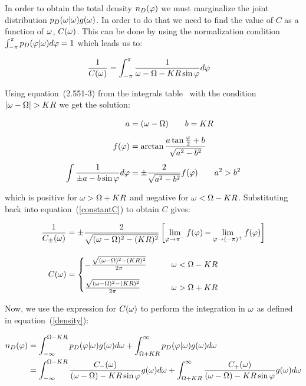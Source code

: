 In order to obtain the total density $n_D(\varphi)$ we must marginalize the joint distribution $p_D(\omega | \omega)g(\omega)$. In
order to do that we need to find the value of $C$ as a function of $\omega$, $C(\omega)$. This can be done by using the normalization
condition $\int_{-\pi}^{\pi}p_D(\varphi | \omega)d\varphi=1$ which leads us to:

\begin{align}
    \frac{1}{C(\omega)} &= \int_{-\pi}^{\pi}\frac{1}{\omega - \Omega - K R \sin \varphi}d\varphi
    \label{constantC}
\end{align}

\noindent Using equation~(2.551-3) from the integrals table~\cite{jeffrey2007table} with the condition $|\omega-\Omega| > K R$ we get
the solution:

\begin{align}
    a&=(\omega-\Omega) \qquad b=K R \notag\\[5pt]
    f(\varphi) &= \arctan\frac{a\tan \frac{\varphi}{2}+b}{\sqrt{a^2-b^2}} \notag\\[5pt]
    \int\frac{1}{\pm a-b\sin \varphi}d\varphi &= \pm\frac{2}{\sqrt{a^2-b^2}}f(\varphi) \qquad a^2 > b^2 \notag
\end{align}

\noindent which is positive for $\omega > \Omega + K R$ and negative for $\omega < \Omega - K R$. Substituting back into
equation~(\ref{constantC}) to obtain $C$ gives:

\begin{align}
    \frac{1}{C_\pm(\omega)} &= \pm\frac{2}{\sqrt{(\omega-\Omega)^2 - (K R)^2}} \left[ \lim_{\varphi \to \pi^-} f(\varphi) - \lim_{\varphi \to (-\pi)^+} f(\varphi) \right] \notag\\[10pt]
    C(\omega) &=
    \begin{cases}
        -\frac{\sqrt{(\omega-\Omega)^2 - (K R)^2}}{2\pi} \qquad &\omega < \Omega - K R \\[10pt]
        \frac{\sqrt{(\omega-\Omega)^2 - (K R)^2}}{2\pi} \qquad &\omega > \Omega + K R
    \end{cases}
    \label{constant}
\end{align}

Now, we use the expression for $C(\omega)$ to perform the integration in $\omega$ as defined in equation~(\ref{density}):

\begin{align}
    n_D(\varphi) &= \int_{-\infty}^{\Omega - K R} p_D(\varphi | \omega)g(\omega)d\omega +
                      \int_{\Omega + K R}^{\infty} p_D(\varphi | \omega)g(\omega)d\omega \notag\\
                   &= \int_{-\infty}^{\Omega - K R} \frac{C_-(\omega)}{(\omega - \Omega) - K R\sin\varphi}g(\omega)d\omega +
                      \int_{\Omega + K R}^{\infty} \frac{C_+(\omega)}{(\omega - \Omega) - K R\sin\varphi}g(\omega)d\omega
                      \label{driftdensityintermediate}
\end{align}

